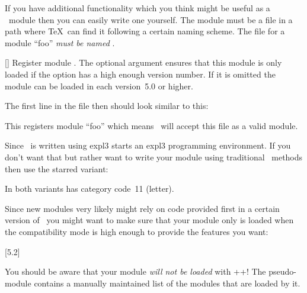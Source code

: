 \documentclass{chemmacros-manual}
\makeatletter
\def\chemmodule*#1{\textquotedblleft#1\textquotedblright}%
\renewenvironment{commands}
  {%
    \let\command\cnltx@command
    \let\explcommand\cnltx@explcommand
    \cnltxlist
  }
  {\endcnltxlist}
\makeatother
\begin{document}
If you have additional functionality which you think might be useful as a
\chemmacros\ module then you can easily write one yourself.  The module must
be a file in a path where \TeX\ can find it following a certain naming
scheme.  The file for a module \chemmodule*{foo} \emph{must be named}
.

\begin{commands}
  \command{ChemModule}[\sarg{}]
    Register module .  The optional argument  ensures that this module is only loaded if the
    option  has a high enough version number.  If it is
    omitted the module can be loaded in each version~5.0 or higher.
\end{commands}

The first line in the file then should look similar to this:
\begin{sourcecode}
\end{sourcecode}
This registers module \chemmodule*{foo} which means \chemmacros\ will accept
this file as a valid module.

Since \chemmacros\ is written using expl3  starts an expl3
programming environment.  If you don't want that but rather want to write your
module using traditional \LaTeXe\ methods then use the starred variant:
\begin{sourcecode}
\end{sourcecode}
In both variants  has category code~11 (letter).

Since new modules very likely might rely on code provided first in a certain
version of \chemmacros\ you might want to make sure that your module only is
loaded when the compatibility mode is high enough to provide the features you
want:
\begin{sourcecode}
  [5.2]
\end{sourcecode}

You should be aware that your module \emph{will not be loaded} with
\verbcode++! The pseudo-module  contains a
manually maintained list of the modules that are loaded by it.
\end{document}
